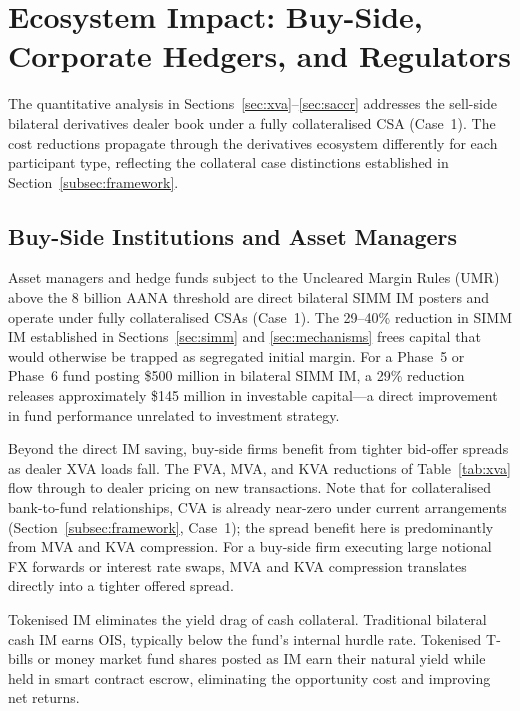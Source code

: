 \documentclass[12pt,letterpaper]{article}
\numberwithin{equation}{section}
\theoremstyle{remark}
\begin{document}
\section{Ecosystem Impact: Buy-Side, Corporate Hedgers, and Regulators}
\label{sec:ecosystem}

The quantitative analysis in Sections~\ref{sec:xva}--\ref{sec:saccr}
addresses the sell-side bilateral derivatives dealer book under a fully
collateralised CSA (Case~1). The cost reductions propagate through the
derivatives ecosystem differently for each participant type, reflecting the
collateral case distinctions established in Section~\ref{subsec:framework}.

\subsection{Buy-Side Institutions and Asset Managers}

Asset managers and hedge funds subject to the Uncleared Margin Rules (UMR)
above the \texteuro{}8 billion AANA threshold are direct bilateral SIMM IM
posters and operate under fully collateralised CSAs (Case~1). The 29--40\%
reduction in SIMM IM established in Sections~\ref{sec:simm} and
\ref{sec:mechanisms} frees capital that would otherwise be trapped as
segregated initial margin. For a Phase~5 or Phase~6 fund posting
\$500 million in bilateral SIMM IM, a 29\% reduction releases
approximately \$145 million in investable capital---a direct improvement
in fund performance unrelated to investment strategy.

Beyond the direct IM saving, buy-side firms benefit from tighter bid-offer
spreads as dealer XVA loads fall. The FVA, MVA, and KVA reductions of
Table~\ref{tab:xva} flow through to dealer pricing on new transactions.
Note that for collateralised bank-to-fund relationships, CVA is already
near-zero under current arrangements (Section~\ref{subsec:framework},
Case~1); the spread benefit here is predominantly from MVA and KVA
compression. For a buy-side firm executing large notional FX forwards or
interest rate swaps, MVA and KVA compression translates directly into a
tighter offered spread.

Tokenised IM eliminates the yield drag of cash collateral. Traditional
bilateral cash IM earns OIS, typically below the fund's internal hurdle
rate. Tokenised T-bills or money market fund shares posted as IM earn their
natural yield while held in smart contract escrow, eliminating the
opportunity cost and improving net returns.
\end{document}
